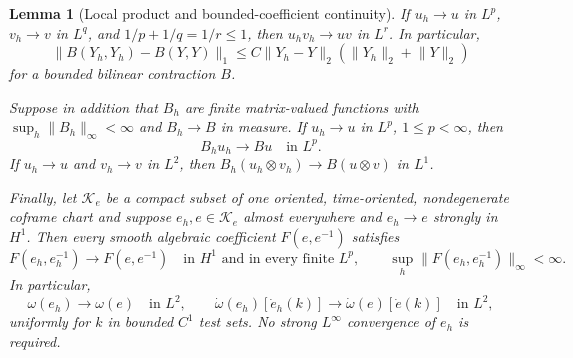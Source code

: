 \documentclass[11pt]{article}
\numberwithin{equation}{section}
\newtheorem{lemma}[lemma]{Lemma}
\theoremstyle{definition}
\theoremstyle{remark}
\newcommand{\norm}[1]{\lVert#1\rVert}
\begin{document}
\begin{lemma}[Local product and bounded-coefficient continuity]
\label{lem:products}
If $u_h\to u$ in $L^p$, $v_h\to v$ in $L^q$, and
$1/p+1/q=1/r\le1$, then $u_hv_h\to uv$ in $L^r$.  In particular,
\begin{equation}
 \norm{B(Y_h,Y_h)-B(Y,Y)}_1
 \le C\norm{Y_h-Y}_2(\norm{Y_h}_2+\norm Y_2)
 \label{eq:quadratic-product}
\end{equation}
for a bounded bilinear contraction $B$.

Suppose in addition that $B_h$ are finite matrix-valued functions with
$\sup_h\norm{B_h}_\infty<\infty$ and $B_h\to B$ in measure.  If
$u_h\to u$ in $L^p$, $1\le p<\infty$, then
\begin{equation}
 B_hu_h\longrightarrow Bu\quad\text{in }L^p.
 \label{eq:bounded-coefficient-product}
\end{equation}
If $u_h\to u$ and $v_h\to v$ in $L^2$, then
$B_h(u_h\otimes v_h)\to B(u\otimes v)$ in $L^1$.

Finally, let $\mathcal K_e$ be a compact subset of one oriented,
time-oriented, nondegenerate coframe chart and suppose
$e_h,e\in\mathcal K_e$ almost everywhere and $e_h\to e$ strongly in
$H^1$.  Then every smooth algebraic coefficient $F(e,e^{-1})$ satisfies
\begin{equation}
 F(e_h,e_h^{-1})\to F(e,e^{-1})
 \quad\text{in }H^1\text{ and in every finite }L^p,
 \qquad \sup_h\norm{F(e_h,e_h^{-1})}_\infty<\infty.
 \label{eq:bounded-chart-composition}
\end{equation}
In particular,
\begin{equation}
 \omega(e_h)\to\omega(e)\quad\text{in }L^2,
 \qquad
 \dot\omega(e_h)[\dot e_h(k)]\to
 \dot\omega(e)[\dot e(k)]\quad\text{in }L^2,
 \label{eq:spin-connection-convergence}
\end{equation}
uniformly for $k$ in bounded $C^1$ test sets.  No strong
$L^\infty$ convergence of $e_h$ is required.
\end{lemma}
\end{document}
